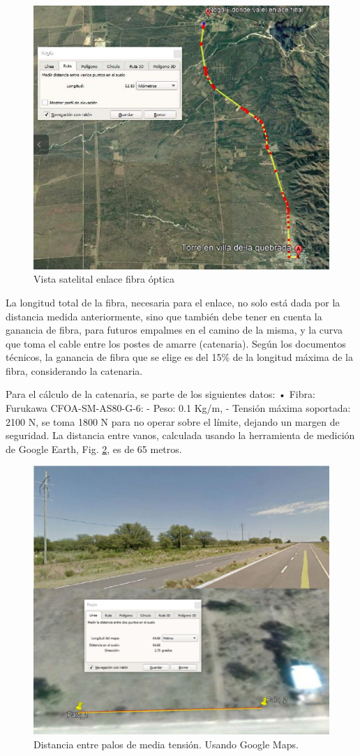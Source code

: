\documentclass[12pt,a4paper]{book}
\begin{document}
\begin{figure} [H]
\centering
\includegraphics[width= 8 cm]{../figuras/red_transporte_14.jpg}
\caption{Vista satelital enlace fibra óptica}
\label{fig_red_transporte_14}
\end{figure}

La longitud total de la fibra, necesaria para el enlace, no solo está dada por la distancia medida anteriormente, sino que también debe tener en cuenta la ganancia de fibra, para futuros empalmes en el camino de la misma, y la curva que toma el cable entre los postes de amarre (catenaria). Según los documentos técnicos, la ganancia de fibra que se elige es del 15\% de la longitud máxima de la fibra, considerando la catenaria.

Para el cálculo de la catenaria, se parte de los siguientes datos:
• Fibra: Furukawa CFOA-SM-AS80-G-6:
	- Peso: 0.1 Kg/m,
	- Tensión máxima soportada: 2100 N, se toma 1800 N para no operar sobre el límite, dejando un margen de seguridad.
La distancia entre vanos, calculada usando la herramienta de medición de Google Earth, Fig. \ref{fig_red_transporte_15}, es de 65 metros.


\begin{figure} [H]
\centering
\includegraphics[width= 8 cm]{../figuras/red_transporte_15.jpg}
\caption{Distancia entre palos de media tensión. Usando Google Maps.}
\label{fig_red_transporte_15}
\end{figure}
\end{document}
